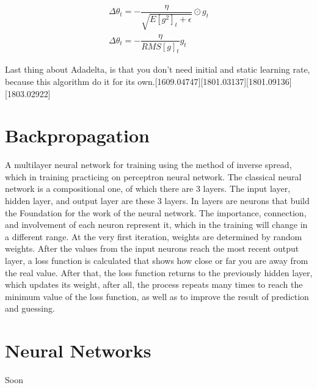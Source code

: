 \begin{equation}
	\begin{split}
			\Delta\theta_t = - \dfrac{\eta}{\sqrt{E[g^2]_t + \epsilon}} \odot g_t \\
			\Delta\theta_t = - \dfrac{\eta}{RMS[g]_t} g_t
	\end{split}
\end{equation}

\noindent Last thing about Adadelta, is that you don't need initial and static learning rate, because this algorithm do it for its own.[1609.04747][1801.03137][1801.09136][1803.02922]

\section{Backpropagation}\label{sec:3.7}
\vspace{-0.5cm}
\noindent A multilayer neural network for training using the method of inverse spread, which in training practicing on perceptron neural network. The classical neural network is a compositional one, of which there are 3 layers. The input layer, hidden layer, and output layer are these 3 layers. In layers are neurons that build the Foundation for the work of the neural network. The importance, connection, and involvement of each neuron represent it, which in the training will change in a different range. At the very first iteration, weights are determined by random weights. After the values from the input neurons reach the most recent output layer, a loss function is calculated that shows how close or far you are away from the real value. After that, the loss function returns to the previously hidden layer, which updates its weight, after all, the process repeats many times to reach the minimum value of the loss function, as well as to improve the result of prediction and guessing.

\vspace{-0.3cm}




\section{Neural Networks}\label{sec:3.8}
\vspace{-0.5cm}
\noindent Soon

\vspace{-0.3cm}


